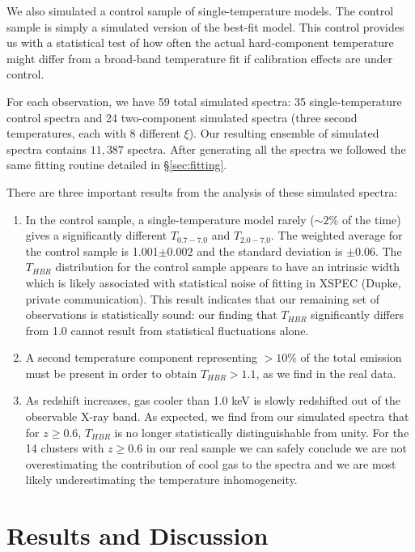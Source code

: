\documentclass[12pt,preprint]{aastex}
\begin{document}
We also simulated a control sample of single-temperature models. The
control sample is simply a simulated version of the best-fit model. This
control provides us with a statistical test of how often the actual
hard-component temperature might differ from a broad-band temperature
fit if calibration effects are under control.

For each observation, we have 59 total simulated spectra: 35
single-temperature control spectra and 24 two-component simulated
spectra (three second temperatures, each with 8 different $\xi$). Our
resulting ensemble of simulated spectra contains $11,387$
spectra. After generating all the spectra we followed the same fitting
routine detailed in \S\ref{sec:fitting}.

There are three important results from the analysis of these simulated
spectra:
\begin{enumerate}
\item In the control sample, a single-temperature model rarely
($\sim 2\%$ of the time) gives a significantly different $T_{0.7-7.0}$ and
$T_{2.0-7.0}$. The weighted average for the control sample is 1.001$\pm
0.002$ and the standard deviation is $\pm0.06$. The $T_{HBR}$
distribution for the control sample appears to have an intrinsic width
which is likely associated with statistical noise of fitting in
{\textsc{XSPEC}} (Dupke, private communication). This result indicates
that our remaining set of observations is statistically sound: our finding that
$T_{HBR}$ significantly differs from 1.0 cannot result from
statistical fluctuations alone.
\item A second temperature component representing $> 10\%$ of the total
emission must be present in order to obtain $T_{HBR} > 1.1$, as we find
in the real data.
\item As redshift increases, gas cooler than 1.0 keV is slowly
redshifted out of the observable X-ray band. As expected, we find from
our simulated spectra that for $z \geq 0.6$, $T_{HBR}$ is no longer
statistically distinguishable from unity. For the 14 clusters with $z
\geq 0.6$ in our real sample we can safely conclude we are not
overestimating the contribution of cool gas to the spectra and we are
most likely underestimating the temperature inhomogeneity.
\end{enumerate}

\section{Results and Discussion} \label{sec:r&d}
\end{document}
